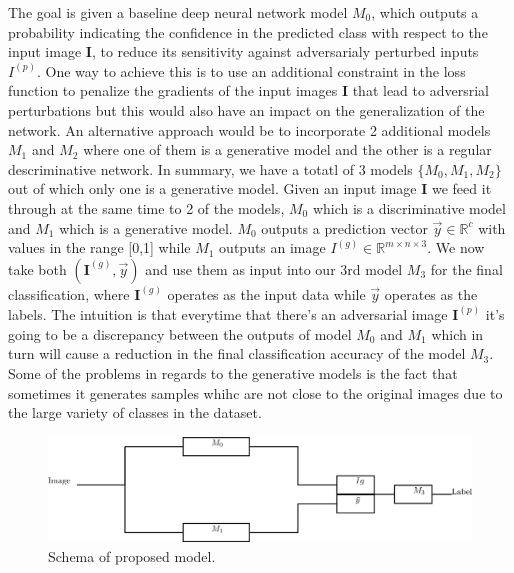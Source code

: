 \documentclass[11pt,twoside,a4paper]{article}
\begin{document}
The goal is given a baseline deep neural network model $M_{0}$, which
outputs a probability indicating the confidence in the predicted class
with respect to the input image $\textbf{I}$, to reduce its
sensitivity against adversarialy perturbed inputs
$I^{\left( p \right)}$. One way to achieve this is to use an
additional constraint in the loss function to penalize the gradients
of the input images $\textbf{I}$ that lead to adversrial perturbations
but this would also have an impact on the generalization of the
network. An alternative approach would be to incorporate 2 additional
models $M_{1}$ and $M_{2}$ where one of them is a generative model and the
other is a regular descriminative network. In summary, we have a
totatl of 3 models $\{M_{0}, M_{1}, M_{2}\}$ out of which only one is a
generative model. Given an input image $\textbf{I}$ we feed it through
at the same time to 2 of the models, $M_{0}$ which is a discriminative
model and $M_{1}$ which is a generative model. $M_{0}$ outputs a
prediction vector $\vec{y} \in \mathbb{R}^{c}$ with values in the range
[0,1] while $M_{1}$ outputs an image
$I^{\left( g \right)} \in \mathbb{R}^{m \times n \times 3}$. We now
take both $\left( \textbf{I}^{\left( g \right)}, \vec{y} \right)$ and
use them as input into our 3rd model $M_{3}$ for the final
classification, where $\textbf{I}^{\left( g \right)}$ operates as the
input data while $\vec{y}$ operates as the labels. The intuition is
that everytime that there's an adversarial image
$\textbf{I}^{\left( p \right)}$ it's going to be a discrepancy between
the outputs of model $M_{0}$ and $M_{1}$ which in turn will cause a
reduction in the final classification accuracy of the model $M_{3}$. Some
of the problems in regards to the generative models is the fact that
sometimes it generates samples whihc are not close to the original
images due to the large variety of classes in the dataset.

\begin{figure}[H]
  \centering
  \includegraphics[width=\linewidth]{schema}
  \caption{Schema of proposed model.}
\end{figure}
\end{document}
